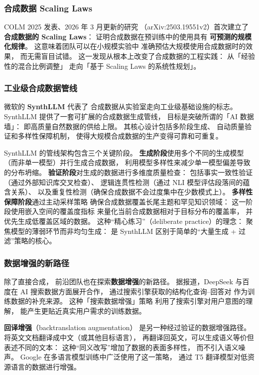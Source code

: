 \subsubsection{合成数据 Scaling Laws}

COLM 2025 发表、2026 年 3 月更新的研究
（arXiv:2503.19551v2）首次建立了
\textbf{合成数据的 Scaling Laws}：
证明合成数据在预训练中的使用具有
\textbf{可预测的规模化规律}。
这意味着团队可以在小规模实验中
准确预估大规模使用合成数据时的效果，
而无需盲目试错。
这一发现从根本上改变了合成数据的工程实践：
从「经验性的混合比例调整」
走向「基于 Scaling Laws 的系统性规划」。

\subsubsection{工业级合成数据管线}

微软的 \textbf{SynthLLM} 代表了
合成数据从实验室走向工业级基础设施的标志。
SynthLLM 提供了一套可扩展的合成数据生成管线，
目标是突破所谓的「AI 数据墙」：
即高质量自然数据的供给上限。
其核心设计包括多阶段生成、
自动质量验证和多样性保障机制，
使得大规模合成数据的生产变得可靠和可重复。

SynthLLM 的管线架构包含三个关键阶段。
\textbf{生成阶段}使用多个不同的生成模型
（而非单一模型）并行生成合成数据，
利用模型多样性来减少单一模型偏差导致的分布坍缩。
\textbf{验证阶段}对生成的数据进行多维度质量检查：
包括事实一致性验证（通过外部知识库交叉检查）、
逻辑连贯性检测（通过 NLI 模型评估段落间的蕴含关系）、
以及重复性检测（确保合成数据不会过度集中在少数模式上）。
\textbf{多样性保障阶段}通过主动采样策略
确保合成数据覆盖长尾主题和罕见知识领域：
这一阶段使用嵌入空间的覆盖度指标
来量化当前合成数据相对于目标分布的覆盖率，
并优先生成低覆盖区域的数据。
这种“精心练习”（deliberate practice）的理念：
聚焦模型的薄弱环节而非均匀生成：
是 SynthLLM 区别于简单的“大量生成 + 过滤”策略的核心。

\subsubsection{数据增强的新路径}

除了直接合成，
前沿团队也在探索\textbf{数据增强}的新路径。
据报道，DeepSeek 与百度在 AI 搜索数据方面展开合作，
通过搜索引擎获取的结构化查询--回答对
作为训练数据的补充来源。
这种「搜索数据增强」策略
利用了搜索引擎对用户意图的理解，
能产生更贴近真实用户需求的训练数据。

\textbf{回译增强}（backtranslation augmentation）
是另一种经过验证的数据增强路径。
将英文文档翻译成中文（或其他目标语言），
再翻译回英文，可以生成语义等价但表述不同的文本：
这种“同义改写”增加了数据的表面多样性，
而不引入语义噪声。
Google 在多语言模型训练中广泛使用了这一策略，
通过 T5 翻译模型对低资源语言的数据进行增强。

